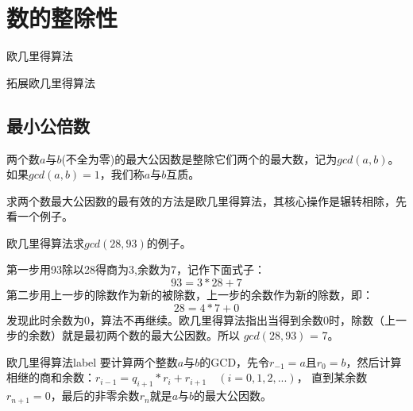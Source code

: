 \chapter{数的整除性}
\begin{introduction}[本章内容提要]
	\item 欧几里得算法
	\item 拓展欧几里得算法
\end{introduction}

\section{最小公倍数}
两个数$a$与$b$(不全为零)的最大公因数是整除它们两个的最大数，记为$gcd(a,b)$。如果$gcd(a,b)=1$，我们称$a$与$b$互质。

求两个数最大公因数的最有效的方法是{\heiti 欧几里得算法}，其核心操作是辗转相除，先看一个例子。

\begin{example}
	欧几里得算法求$gcd(28,93)$的例子。
	
	第一步用93除以28得商为3,余数为7，记作下面式子：
	$$
		93 = 3*28 + 7
	$$
	第二步用上一步的除数作为新的被除数，上一步的余数作为新的除数，即：
	$$
		28 = 4*7 + 0
	$$
	发现此时余数为0，算法不再继续。欧几里得算法指出当得到余数0时，除数（上一步的余数）就是最初两个数的最大公因数。所以
	$gcd(28,93)$ = 7。
\end{example}

\begin{theorem}{欧几里得算法}{label}
	要计算两个整数$a$与$b$的GCD，先令$r_{-1}=a$且$r_{0}=b$，然后计算相继的商和余数：$r_{i-1}=q_{i+1}*r_{i}+r_{i+1} \quad (i=0,1,2,...)$，
	直到某余数$r_{n+1}=0$，最后的非零余数$r_{n}$就是$a$与$b$的最大公因数。
\end{theorem}

